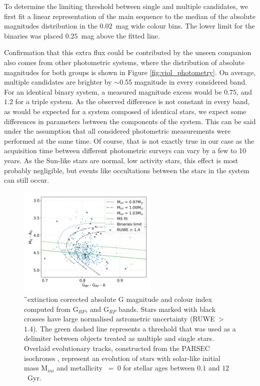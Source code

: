 To determine the limiting threshold between single and multiple candidates, we first fit a linear representation of the main sequence to the median of the absolute magnitudes distribution in the $0.02$~mag wide colour bins. The lower limit for the binaries was placed $0.25$~mag above the fitted line.

Confirmation that this extra flux could be contributed by the unseen companion also comes from other photometric systems, where the distribution of absolute magnitudes for both groups is shown in Figure \ref{fig:viol_photometry}. On average, multiple candidates are brighter by $\sim$0.55 magnitude in every considered band. For an identical binary system, a measured magnitude excess would be $0.75$, and $1.2$ for a triple system. As the observed difference is not constant in every band, as would be expected for a system composed of identical stars, we expect some differences in parameters between the components of the system. This can be said under the assumption that all considered photometric measurements were performed at the same time. Of course, that is not exactly true in our case as the acquisition time between different photometric surveys can vary by a few to 10 years. As the Sun-like stars are normal, low activity stars, this effect is most probably negligible, but events like occultations between the stars in the system can still occur. 

\begin{figure}
	\centering
	\includegraphics[width=0.6\textwidth]{mag_hr_gaia_bin-multi_evol_mh000_nores_ebv_c3_07.png}
	\caption{\G\ extinction corrected absolute G magnitude and colour index computed from G$_{BP}$, and G$_{RP}$ bands. Stars marked with black crosses have large normalised astrometric uncertainty (RUWE~>~$1.4$). The green dashed line represents a threshold that was used as a delimiter between objects treated as multiple and single stars. Overlaid evolutionary tracks, constructed from the PARSEC isochrones \citep{2017ApJ...835...77M}, represent an evolution of stars with solar-like initial mass M$_{ini}$ and metallicity \Mh~=~0 for stellar ages between $0.1$ and $12$~Gyr.}
	\label{fig:gabs_colour}
\end{figure}

